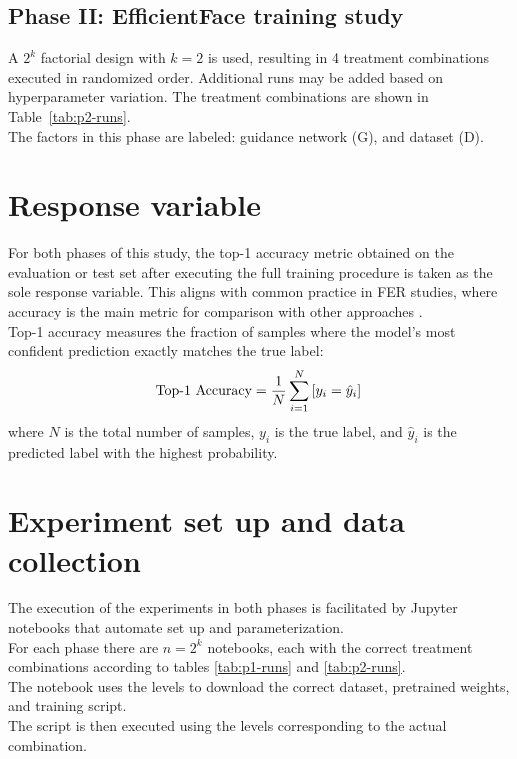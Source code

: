 \subsection{Phase II: EfficientFace training study}
A $2^k$ factorial design with $k=2$ is used, resulting in 4 treatment combinations executed in randomized order. Additional runs may be added based on hyperparameter variation. The treatment combinations are shown in Table~\ref{tab:p2-runs}.\\
The factors in this phase are labeled: guidance network (G), and dataset (D).



\section{Response variable}
For both phases of this study, the top-1 accuracy metric obtained on the evaluation or test set after executing the full training procedure is taken as the sole response variable. This aligns with common practice in FER studies, where accuracy is the main metric for comparison with other approaches \cite{li2022survey, karnati2023survey, canal2022survey}.\\
Top-1 accuracy measures the fraction of samples where the model's most confident prediction exactly matches the true label:\\
\begin{equation}
    \text{Top-1 Accuracy} = \frac{1}{N} \sum_{i=1}^{N} \left[ y_i = \hat{y}_i \right]\\
\end{equation}
where $N$ is the total number of samples, $y_i$ is the true label, and $\hat{y}_i$ is the predicted label with the highest probability.

\section{Experiment set up and data collection}
The execution of the experiments in both phases is facilitated by Jupyter notebooks that automate set up and parameterization.\\
For each phase there are $n=2^k$ notebooks, each with the correct treatment combinations according to tables \ref{tab:p1-runs} and \ref{tab:p2-runs}.\\
The notebook uses the levels to download the correct dataset, pretrained weights, and training script.\\
The script is then executed using the levels corresponding to the actual combination.\\

